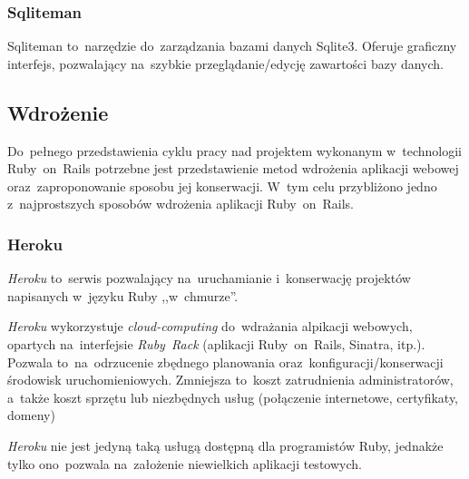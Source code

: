 \subsubsection{Sqliteman}

Sqliteman\cite{sqliteman} to~narzędzie do~zarządzania bazami danych Sqlite3. Oferuje graficzny interfejs, pozwalający na~szybkie przeglądanie/edycję zawartości bazy danych.

\subsection{Wdrożenie}

Do~pełnego przedstawienia cyklu pracy nad projektem wykonanym w~technologii Ruby~on~Rails potrzebne jest przedstawienie metod wdrożenia aplikacji webowej oraz~zaproponowanie sposobu jej konserwacji. W~tym celu przybliżono jedno z~najprostszych sposobów wdrożenia aplikacji Ruby~on~Rails.

\subsubsection{Heroku}

\textit{Heroku}\cite{heroku} to~serwis pozwalający na~uruchamianie i~konserwację projektów napisanych w~języku Ruby ,,w~chmurze''.


\textit{Heroku} wykorzystuje \textit{cloud-computing} do~wdrażania alpikacji webowych, opartych na~interfejsie \textit{Ruby~Rack} (aplikacji Ruby~on~Rails, Sinatra, itp.). Pozwala to~na~odrzucenie zbędnego planowania oraz~konfiguracji/konserwacji środowisk uruchomieniowych. Zmniejsza to~koszt zatrudnienia administratorów, a~także koszt sprzętu lub niezbędnych usług (połączenie internetowe, certyfikaty, domeny)


\textit{Heroku} nie jest jedyną taką usługą dostępną dla programistów Ruby, jednakże tylko ono~pozwala na~założenie niewielkich aplikacji testowych.
